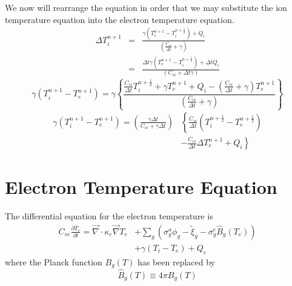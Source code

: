 \documentclass[12pt]{article}
\newcommand{\partl}[2]{\ensuremath{\frac{\partial{#1}}{\partial{#2}}}}\newcommand{\del}{\ensuremath{\vec{\nabla}}}
\newcommand{\dt}{\ensuremath{\Delta t}}
\newcommand{\cviOdt}{\ensuremath{\frac{C_{vi}}{\dt}}}
\newcommand{\Bg}{\ensuremath{\hat{B}_{g}}}
\begin{document}
We now will rearrange the equation in order that we may substitute the
ion temperature equation into the electron temperature equation.
\begin{eqnarray}
        \Delta T_{i}^{n+1} &=& \frac{ \gamma ( T_{e}^{n+1} - T_{i}^{n+\frac{1}{2}} )
                                + Q_{i} }{(\cviOdt + \gamma)} 
                \\
                           &=& \frac{ \dt \gamma
                                         ( T_{e}^{n+1} - T_{i}^{n+\frac{1}{2}} )
                                + \dt Q_{i} }{(C_{vi} + \dt \gamma)}
\end{eqnarray}
\begin{equation}
        \gamma (T_{i}^{n+1}-T_{e}^{n+1}) =
                \gamma \left\{ \frac{\cviOdt T_{i}^{n+\frac{1}{2}} + \gamma T_{e}^{n+1}
                                + Q_{i} - (\cviOdt + \gamma) T_{e}^{n+1}}
                                {(\cviOdt + \gamma)} \right\}
\end{equation}
\begin{equation}
   \boxed{
   \begin{split}
        \gamma (T_{i}^{n+1}-T_{e}^{n+1}) =
                \left(\frac{\gamma\dt}{C_{vi} + \gamma \dt} \right)
                &  \left\{\cviOdt(T_{i}^{n+\frac{1}{2}} - T_{e}^{n+\frac{1}{2}}) \right.
        \\
                & \left.
                        - \cviOdt \Delta T_{e}^{n+1}
                        + Q_{i} \right\}
   \end{split}
   }
\label{eq:Ti}
\end{equation}

\section{Electron Temperature Equation}

The differential equation for the electron temperature is
\begin{equation}
  \begin{split}
        C_{ve} \partl{T_{e}}{t} = 
                \del \cdot \kappa_{e} \del T_{e} & +
                \sum_{g} \left(
                        \sigma_{g}^{a} \phi_{g} - \tilde{\xi}_{g}
                        - \sigma_{g}^{e} \Bg(T_{e}) \right) \\
                        & + \gamma (T_{i} - T_{e}) + Q_{e}
  \end{split}
\end{equation}
where the Planck function $B_{g}(T)$ has been replaced by
\begin{equation}
        \Bg(T) \equiv 4\pi B_{g}(T)
\end{equation}
\end{document}

